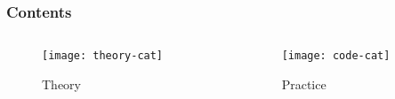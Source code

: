\begin{frame}[plain]
  \frametitle{Contents}
  \begin{columns}
    \begin{column}{0.5\textwidth}
      \begin{figure}[h!]
        \texttt{[image: theory-cat]}
        \caption{\Large\color{orange} Theory}
      \end{figure}
    \end{column}
    \begin{column}{0.5\textwidth}
      \begin{figure}[h!]
        \texttt{[image: code-cat]}
        \caption{\Large\color{orange} Practice}
      \end{figure}
    \end{column}
  \end{columns}
\end{frame}
